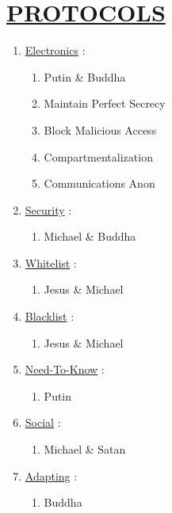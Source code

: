 \documentclass[11pt]{article}
\begin{document}
\section*{\ul{PROTOCOLS}}
\begin{enumerate}
	\item[] \ul{Electronics} :
	\begin{enumerate}
		\item[] Putin \& Buddha
		
		\item[] Maintain Perfect Secrecy
		\item[] Block Malicious Access
		\item[] Compartmentalization
		\item[] Communications Anon
	\end{enumerate}

	\item[] \ul{Security} :
	\begin{enumerate}
		\item[] Michael \& Buddha
	\end{enumerate}

	\item[] \ul{Whitelist} :
	\begin{enumerate}
		\item[] Jesus \& Michael
	\end{enumerate}
	
	\item[] \ul{Blacklist} :
	\begin{enumerate}
		\item[] Jesus \& Michael
	\end{enumerate}

	\item[] \ul{Need-To-Know} :
	\begin{enumerate}
		\item[] Putin
	\end{enumerate}

	\item[] \ul{Social}  :
	\begin{enumerate}
		\item[] Michael \& Satan
	\end{enumerate}

	\item[] \ul{Adapting} :
	\begin{enumerate}
		\item[] Buddha
	\end{enumerate}
\end{enumerate}
\end{document}
